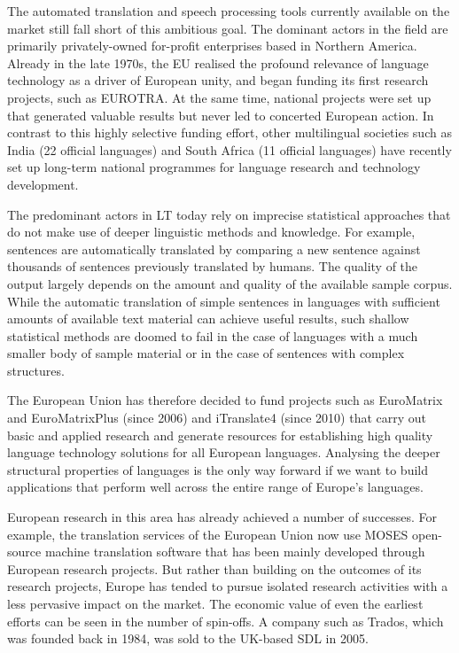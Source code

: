 \documentclass[]{../metanetpaper}
\begin{document}
\begin{multicols}{2}
The automated translation and speech processing tools currently available on the market still fall short of this ambitious goal. The dominant actors in the field are primarily privately-owned for-profit enterprises based in Northern America. Already in the late 1970s, the EU realised the profound relevance of language technology as a driver of European unity, and began funding its first research projects, such as EUROTRA. At the same time, national projects were set up that generated valuable results but never led to concerted European action. In contrast to this highly selective funding effort, other multilingual societies such as India (22 official languages) and South Africa (11 official languages) have recently set up long-term national programmes for language research and technology development. 

    The predominant actors in LT today rely on imprecise statistical approaches that do not make use of deeper linguistic methods and knowledge. For example, sentences are automatically translated by comparing a new sentence against thousands of sentences previously translated by humans. The quality of the output largely depends on the amount and quality of the available sample corpus. While the automatic translation of simple sentences in languages with sufficient amounts of available text material can achieve useful results, such shallow statistical methods are doomed to fail in the case of languages with a much smaller body of sample material or in the case of sentences with complex structures.

   The European Union has therefore decided to fund projects such as EuroMatrix and EuroMatrixPlus (since 2006) and iTranslate4 (since 2010) that carry out basic and applied research and generate resources for establishing high quality language technology solutions for all European languages. Analysing the deeper structural properties of languages is the only way forward if we want to build applications that perform well across the entire range of Europe’s languages.

    European research in this area has already achieved a number of successes. For example, the translation services of the European Union now use MOSES open-source machine translation software that has been mainly developed through European research projects. But rather than building on the outcomes of its research projects, Europe has tended to pursue isolated research activities with a less pervasive impact on the market.  The economic value of even the earliest efforts can be seen in the number of spin-offs. A company such as Trados, which was founded back in 1984, was sold to the UK-based SDL in 2005.


\end{multicols}
\end{document}
